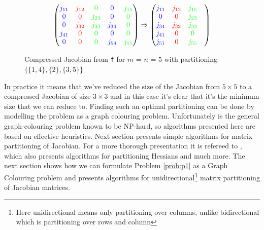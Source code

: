 \begin{figure}[H]
		$$ \left(\begin{matrix}
	{\color{blue} j_{11}} & {\color{red} j_{12}} & {\color{green} 0 }        &  {\color{blue} 0 }       & {\color{green} j_{15}} \\
	{\color{blue} 0}        & {\color{red} 0 }       & {\color{green} j_{23}}  &  {\color{blue} 0 }      & {\color{green} 0} \\
	{\color{blue} 0}        & {\color{red}j_{32}} &  {\color{green} j_{33}}  & {\color{blue} j_{34}} & {\color{green} 0 } \\
	{\color{blue} j_{41}} & {\color{red} 0 }       & {\color{green} 0 }         & {\color{blue} 0 }        & {\color{green} 0} \\
	{\color{blue} 0 }       & {\color{red} 0 }       & {\color{green} 0 }         & {\color{blue} j_{54}} & {\color{green} j_{55} }
	\end{matrix}\right) \Rightarrow \left(\begin{matrix}
	{\color{blue} j_{11}} & {\color{red} j_{12}} & {\color{green} j_{15}} \\
	{\color{blue} 0} & {\color{red} 0} & {\color{green} j_{23}} \\
	{\color{blue} j_{34}} & {\color{red} j_{32}} & {\color{green} j_{33}}  \\
	{\color{blue} j_{41}} & {\color{red} 0} & {\color{green} 0}  \\
	{\color{blue} j_{51}} & {\color{red} 0} & {\color{green} j_{55}} &  
	\end{matrix}\right) $$
	\caption{Compressed Jacobian from \texttt{f} for $m$ = $n$ = $5$ with partitioning $\{\{1,4\}, \{2\}, \{3,5\}\}$}
	\label{fig:Jacob_partition}
\end{figure}
In practice it means that we've reduced the size of the Jacobian from $5 \times 5$ to a compressed Jacobian of size $3 \times 3$ and in this case it's clear that it's the minimum size that we can reduce to. Finding such an optimal partitioning can be done
by modelling the problem as a graph colouring problem.  Unfortunately is 
the general graph-colouring problem known to be NP-hard, so algorithms presented here are based on effective heuristics. Next section presents simple algorithms for matrix partitioning of Jacobian. For a more thorough presentation it is refereed to \cite{Jacobian}, which also presents algorithms for 
partitioning Hessians and much more. The next section shows how we can formulate Problem \ref{prob:p1} as a 
Graph Colouring problem and presents algorithms for unidirectional\footnote{Here unidirectional means only partitioning over columns, unlike bidirectional which is partitioning over rows and column} matrix partitioning of Jacobian matrices. 


